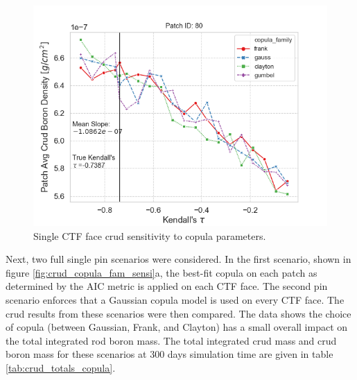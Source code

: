 \begin{figure}[H]
    \centering
    \includegraphics[width=0.8\linewidth]{figs/synth/patch_crud_fit_80}
    \caption{Single CTF face crud sensitivity to copula parameters.}
    \label{fig:patchcrudfit80}
\end{figure}

Next, two full single pin scenarios were considered. In the first scenario, shown in figure \ref{fig:crud_copula_fam_sensi}a, the best-fit copula on each patch as determined by the AIC metric is applied on each CTF face.  The second pin scenario enforces that a Gaussian copula model is used on every CTF face.  The crud results from these scenarios were then compared.  The data shows the choice of copula (between Gaussian, Frank, and Clayton) has a small overall impact on the total integrated rod boron mass.   The total integrated crud mass and crud boron mass for these scenarios at 300 days simulation time are given in table \ref{tab:crud_totals_copula}.

